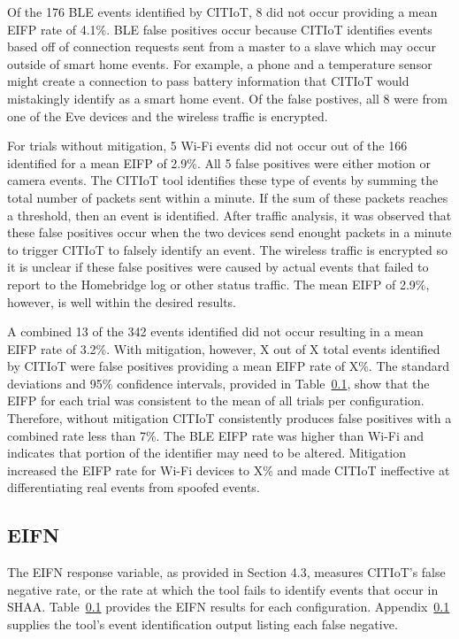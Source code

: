 \documentclass[12pt,letterpaper,oneside]{book}
\begin{document}
	Of the 176 \ac{BLE} events identified by \ac{CITIoT}, 8 did not occur providing a mean \ac{EIFP} rate of 4.1\%. \ac{BLE} false positives occur because \ac{CITIoT} identifies events based off of connection requests sent from a master to a slave which may occur outside of smart home events. For example, a phone and a temperature sensor might create a connection to pass battery information that \ac{CITIoT} would mistakingly identify as a smart home event. Of the false postives, all 8 were from one of the Eve devices and the wireless traffic is encrypted.
	
	For trials without mitigation, 5 Wi-Fi events did not occur out of the 166 identified for a mean \ac{EIFP} of 2.9\%. All 5 false positives were either motion or camera events. The \ac{CITIoT} tool identifies these type of events by summing the total number of packets sent within a minute. If the sum of these packets reaches a threshold, then an event is identified. After traffic analysis, it was observed that these false positives occur when the two devices send enought packets in a minute to trigger \ac{CITIoT} to falsely identify an event. The wireless traffic is encrypted so it is unclear if these false positives were caused by actual events that failed to report to the Homebridge log or other status traffic. The mean \ac{EIFP} of 2.9\%, however, is well within the desired results.
	
	A combined 13 of the 342 events identified did not occur resulting in a mean \ac{EIFP} rate of 3.2\%. With mitigation, however, X out of X total events identified by \ac{CITIoT} were false positives providing a mean \ac{EIFP} rate of X\%. The standard deviations and 95\% confidence intervals, provided in Table~\ref{}, show that the \ac{EIFP} for each trial was consistent to the mean of all trials per configuration. Therefore, without mitigation \ac{CITIoT} consistently produces false positives with a combined rate less than 7\%. The \ac{BLE} \ac{EIFP} rate was higher than Wi-Fi and indicates that portion of the identifier may need to be altered. Mitigation increased the \ac{EIFP} rate for Wi-Fi devices to X\% and made \ac{CITIoT} ineffective at differentiating real events from spoofed events.
	
	
	\subsection{\ac{EIFN}}
	The \ac{EIFN} response variable, as provided in Section 4.3, measures \ac{CITIoT}'s false negative rate, or the rate at which the tool fails to identify events that occur in \ac{SHAA}. Table~\ref{} provides the \ac{EIFN} results for each configuration. Appendix~\ref{} supplies the tool's event identification output listing each false negative. 
	
\end{document}
